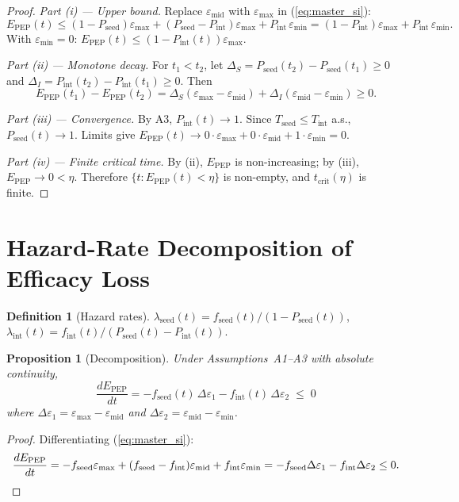 \documentclass[11pt]{article}
\newtheorem{proposition}{Proposition}[section]
\theoremstyle{definition}
\newtheorem{definition}{Definition}[section]
\theoremstyle{remark}
\newcommand{\Tseed}{T_{\text{seed}}}
\newcommand{\Tint}{T_{\text{int}}}
\newcommand{\Pseed}{P_{\text{seed}}}
\newcommand{\Pint}{P_{\text{int}}}
\newcommand{\Epep}{E_{\text{PEP}}}
\newcommand{\tcrit}{t_{\text{crit}}}
\newcommand{\emax}{\varepsilon_{\max}}
\newcommand{\emid}{\varepsilon_{\text{mid}}}
\newcommand{\emin}{\varepsilon_{\min}}
\begin{document}
\begin{proof}
\textit{Part (i) --- Upper bound.} Replace $\emid$ with $\emax$ in (\ref{eq:master_si}):
\[
\Epep(t) \leq (1 - \Pseed)\emax + (\Pseed - \Pint)\emax + \Pint\,\emin = (1 - \Pint)\emax + \Pint\,\emin.
\]
With $\emin = 0$: $\Epep(t) \leq (1 - \Pint(t))\emax$.

\textit{Part (ii) --- Monotone decay.} For $t_{1} < t_{2}$, let $\Delta_{S} = \Pseed(t_{2}) - \Pseed(t_{1}) \geq 0$ and $\Delta_{I} = \Pint(t_{2}) - \Pint(t_{1}) \geq 0$. Then
\[
\Epep(t_{1}) - \Epep(t_{2}) = \Delta_{S}(\emax - \emid) + \Delta_{I}(\emid - \emin) \geq 0.
\]

\textit{Part (iii) --- Convergence.} By A3, $\Pint(t) \to 1$. Since $\Tseed \leq \Tint$ a.s., $\Pseed(t) \to 1$. Limits give $\Epep(t) \to 0\cdot\emax + 0\cdot\emid + 1\cdot\emin = 0$.

\textit{Part (iv) --- Finite critical time.} By (ii), $\Epep$ is non-increasing; by (iii), $\Epep \to 0 < \eta$. Therefore $\{t : \Epep(t) < \eta\}$ is non-empty, and $\tcrit(\eta)$ is finite.
\end{proof}

\section{Hazard-Rate Decomposition of Efficacy Loss}

\begin{definition}[Hazard rates]
$\lambda_{\text{seed}}(t) = f_{\text{seed}}(t)/(1 - \Pseed(t))$, $\lambda_{\text{int}}(t) = f_{\text{int}}(t)/(\Pseed(t) - \Pint(t))$.
\end{definition}

\begin{proposition}[Decomposition]\label{prop:hazard}
Under Assumptions~A1--A3 with absolute continuity,
\begin{equation}
\frac{d\Epep}{dt} = -f_{\text{seed}}(t)\,\Delta\varepsilon_{1} - f_{\text{int}}(t)\,\Delta\varepsilon_{2} \;\leq\; 0
\label{eq:hazard_si}
\end{equation}
where $\Delta\varepsilon_{1} = \emax - \emid$ and $\Delta\varepsilon_{2} = \emid - \emin$.
\end{proposition}

\begin{proof}
Differentiating (\ref{eq:master_si}):
\[
\frac{d\Epep}{dt} = -f_{\text{seed}}\emax + (f_{\text{seed}} - f_{\text{int}})\emid + f_{\text{int}}\emin = -f_{\text{seed}}\Delta\varepsilon_{1} - f_{\text{int}}\Delta\varepsilon_{2} \leq 0. \qedhere
\]
\end{proof}
\end{document}
